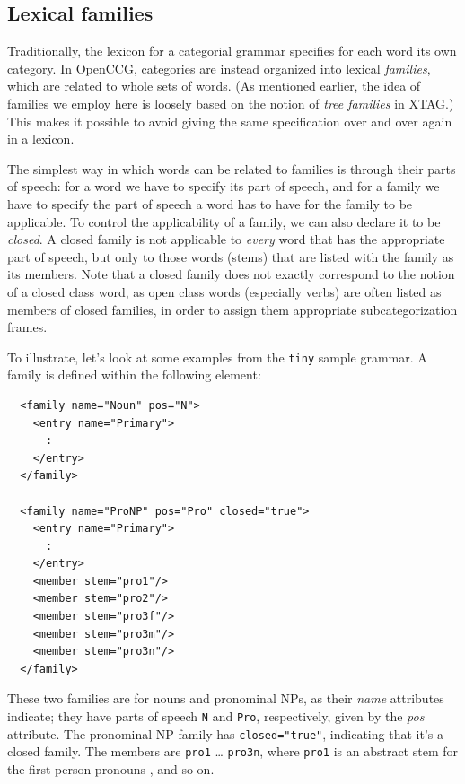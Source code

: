 \documentclass[11pt]{article}
\newcommand{\occg}{OpenCCG}
\begin{document}
\subsection{Lexical families}

Traditionally, the lexicon for a categorial grammar specifies for each
word its own category. In \occg, categories are instead organized into
lexical \textsl{families}, which are related to whole sets of words. (As
mentioned earlier, the idea of families we employ here is loosely based
on the notion of \emph{tree families} in XTAG.) This makes it possible
to avoid giving the same specification over and over again in a lexicon.

The simplest way in which words can be related to families is through
their parts of speech: for a word we have to specify its part of speech,
and for a family we have to specify the part of speech a word has to
have for the family to be applicable. To control the applicability of a
family, we can also declare it to be \textsl{closed}. A closed 
family is not applicable to \emph{every} word that has the appropriate
part of speech, but only to those words (stems) that are listed with the
family as its members.  Note that a closed family does not exactly
correspond to the notion of a closed class word, as open class words
(especially verbs) are often listed as members of closed families, in
order to assign them appropriate subcategorization frames.

To illustrate, let's look at some examples from the \texttt{tiny} sample
grammar. A family is defined within the following element:

\begin{verbatim}
  <family name="Noun" pos="N">
    <entry name="Primary">
      :
    </entry>
  </family>

  <family name="ProNP" pos="Pro" closed="true">
    <entry name="Primary">
      :
    </entry>
    <member stem="pro1"/>
    <member stem="pro2"/>
    <member stem="pro3f"/>
    <member stem="pro3m"/>
    <member stem="pro3n"/>
  </family>
\end{verbatim}

\noindent These two families are for nouns and pronominal NPs, as their
\textsl{name} attributes indicate; they have parts of speech \texttt{N}
and \texttt{Pro}, respectively, given by the \textsl{pos} attribute.
The pronominal NP family has \texttt{closed="true"}, indicating that
it's a closed family.  The members are \texttt{pro1} \ldots
\texttt{pro3n}, where \texttt{pro1} is an abstract stem for the first
person pronouns , and so on.
\end{document}
